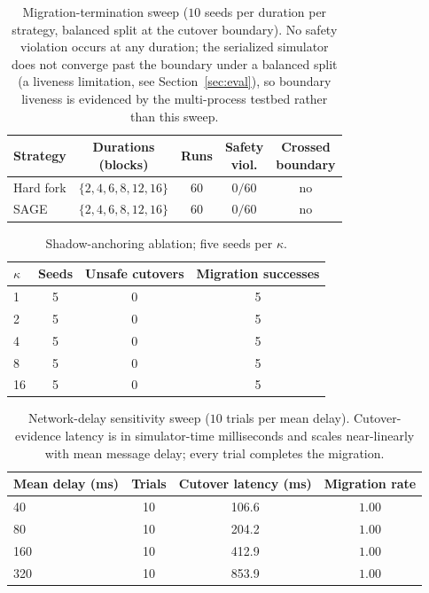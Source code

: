 \documentclass[journal]{IEEEtran}
\theoremstyle{remark}
\begin{document}
\begin{table}[h]
\centering
\caption{Migration-termination sweep
($10$ seeds per duration per strategy, balanced split at the cutover boundary). No safety violation
occurs at any duration; the serialized simulator does not converge past the boundary under a
balanced split (a liveness limitation, see Section~\ref{sec:eval}), so boundary liveness is
evidenced by the multi-process testbed rather than this sweep.}
\label{tab:apptermination}
\setlength{\tabcolsep}{4pt}\renewcommand{\arraystretch}{1.15}\footnotesize
\begin{tabular}{lcccc}
\toprule
Strategy & \makecell{Durations\\(blocks)} & Runs & \makecell{Safety\\viol.} & \makecell{Crossed\\boundary} \\
\midrule
Hard fork & $\{2,4,6,8,12,16\}$ & 60 & $0/60$ & no \\
SAGE      & $\{2,4,6,8,12,16\}$ & 60 & $0/60$ & no \\
\bottomrule
\end{tabular}
\end{table}

\begin{table}[h]
\centering
\caption{Shadow-anchoring ablation; five seeds per $\kappa$.}
\label{tab:appabl}
\setlength{\tabcolsep}{5pt}\renewcommand{\arraystretch}{1.15}\footnotesize
\begin{tabular}{lccc}
\toprule
$\kappa$ & Seeds & Unsafe cutovers & Migration successes \\
\midrule
1  & 5 & 0 & 5 \\
2  & 5 & 0 & 5 \\
4  & 5 & 0 & 5 \\
8  & 5 & 0 & 5 \\
16 & 5 & 0 & 5 \\
\bottomrule
\end{tabular}
\end{table}

\begin{table}[h]
\centering
\caption{Network-delay sensitivity sweep
($10$ trials per mean delay). Cutover-evidence latency is in simulator-time milliseconds and scales
near-linearly with mean message delay; every trial completes the migration.}
\label{tab:appsens}
\setlength{\tabcolsep}{5pt}\renewcommand{\arraystretch}{1.15}\footnotesize
\begin{tabular}{lccc}
\toprule
Mean delay (ms) & Trials & Cutover latency (ms) & Migration rate \\
\midrule
40  & 10 & 106.6 & $1.00$ \\
80  & 10 & 204.2 & $1.00$ \\
160 & 10 & 412.9 & $1.00$ \\
320 & 10 & 853.9 & $1.00$ \\
\bottomrule
\end{tabular}
\end{table}
\end{document}

